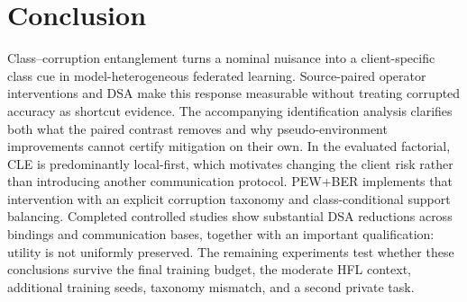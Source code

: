 \section{Conclusion}

Class--corruption entanglement turns a nominal nuisance into a client-specific class cue in model-heterogeneous federated learning. Source-paired operator interventions and DSA make this response measurable without treating corrupted accuracy as shortcut evidence. The accompanying identification analysis clarifies both what the paired contrast removes and why pseudo-environment improvements cannot certify mitigation on their own. In the evaluated factorial, CLE is predominantly local-first, which motivates changing the client risk rather than introducing another communication protocol. PEW+BER implements that intervention with an explicit corruption taxonomy and class-conditional support balancing. Completed controlled studies show substantial DSA reductions across bindings and communication bases, together with an important qualification: utility is not uniformly preserved. The remaining experiments test whether these conclusions survive the final training budget, the moderate HFL context, additional training seeds, taxonomy mismatch, and a second private task.
